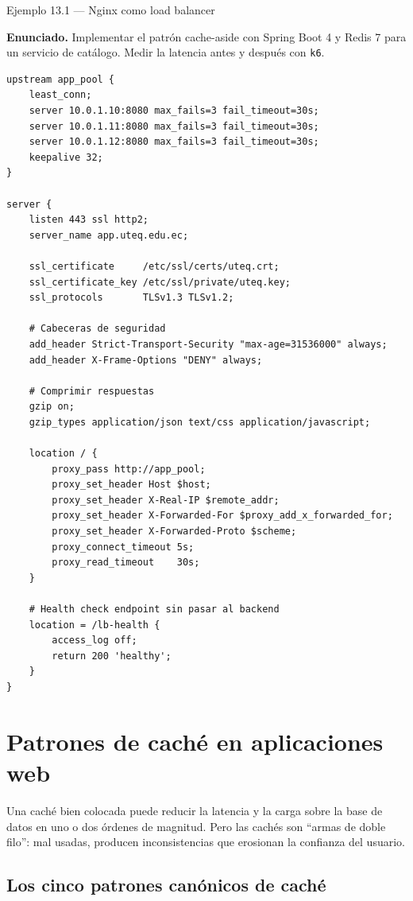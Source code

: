 \begin{cajaejemplo}{Ejemplo 13.1 --- Nginx como load balancer}

\textbf{Enunciado.} Implementar el patrón cache-aside con Spring Boot 4 y Redis 7 para un servicio de catálogo. Medir la latencia antes y después con \texttt{k6}.

\begin{lstlisting}[style=shell,caption={nginx.conf},label=lst:13.1]
upstream app_pool {
    least_conn;
    server 10.0.1.10:8080 max_fails=3 fail_timeout=30s;
    server 10.0.1.11:8080 max_fails=3 fail_timeout=30s;
    server 10.0.1.12:8080 max_fails=3 fail_timeout=30s;
    keepalive 32;
}

server {
    listen 443 ssl http2;
    server_name app.uteq.edu.ec;

    ssl_certificate     /etc/ssl/certs/uteq.crt;
    ssl_certificate_key /etc/ssl/private/uteq.key;
    ssl_protocols       TLSv1.3 TLSv1.2;

    # Cabeceras de seguridad
    add_header Strict-Transport-Security "max-age=31536000" always;
    add_header X-Frame-Options "DENY" always;

    # Comprimir respuestas
    gzip on;
    gzip_types application/json text/css application/javascript;

    location / {
        proxy_pass http://app_pool;
        proxy_set_header Host $host;
        proxy_set_header X-Real-IP $remote_addr;
        proxy_set_header X-Forwarded-For $proxy_add_x_forwarded_for;
        proxy_set_header X-Forwarded-Proto $scheme;
        proxy_connect_timeout 5s;
        proxy_read_timeout    30s;
    }

    # Health check endpoint sin pasar al backend
    location = /lb-health {
        access_log off;
        return 200 'healthy';
    }
}
\end{lstlisting}
\end{cajaejemplo}

\section{Patrones de caché en aplicaciones web}

Una caché bien colocada puede reducir la latencia y la
carga sobre la base de datos en uno o dos órdenes de magnitud. Pero
las cachés son ``armas de doble filo'': mal usadas, producen
inconsistencias que erosionan la confianza del usuario.


\subsection{Los cinco patrones canónicos de caché}


